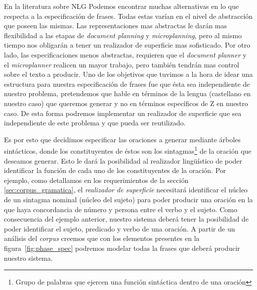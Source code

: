 En la literatura sobre NLG Podemos encontrar muchas alternativas en lo que respecta a la especificación de frases. Todas estas varían en el nivel de abstracción que poseen las mismas. Las representaciones mas abstractas le darán mas flexibilidad a las etapas de \textit{document planning} y \textit{microplanning}, pero al mismo tiempo nos obligarán a tener un realizador de superficie mas sofisticado. Por otro lado, las especificaciones menos abstractas, requieren que el \textit{document planner} y el \textit{microplanner} realicen un mayor trabajo, pero también tendrán mas control sobre el texto a producir. Uno de los objetivos que tuvimos a la hora de idear una estructura para nuestra especificación de frases fue que ésta sea independiente de nuestro problema, pretendemos que hable en términos de la lengua (castellano en nuestro caso) que queremos generar y no en términos específicos de Z en nuestro caso. De esta forma podremos implementar un realizador de superficie que sea independiente de este problema y que pueda ser reutilizado. %


Es por esto que decidimos especificar las oraciones a generar mediante árboles sintácticos, donde los constituyentes de éstos son los sintagmas\footnote{Grupo de palabras que ejercen una función sintáctica dentro de una oración} de la oración que deseamos generar. Esto le dará la posibilidad al realizador lingüístico de poder identificar la función de cada uno de los constituyentes de la oración. Por ejemplo, como detallamos en los requerimientos de la sección \ref{sec:corpus_gramatica}, el \emph{realizador de superficie} necesitará identificar el núcleo de un sintagma nominal (núcleo del sujeto) para poder producir una oración en la que haya concordancia de número y persona entre el verbo y el sujeto. Como consecuencia del ejemplo anterior, nuestro sistema deberá tener la posibilidad de poder identificar el sujeto, predicado y verbo de una oración. A partir de un análisis del \emph{corpus} creemos que con los elementos presentes en la figura~\ref{fig:phase_spec} podremos modelar todas la frases que deberá producir nuestro sistema.

